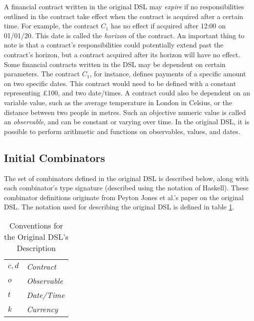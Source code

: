 A financial contract written in the original DSL may \textit{expire} if no responsibilities outlined in the contract take effect when the contract is acquired after a certain time. For example, the contract $C_1$ has no effect if acquired after 12:00 on 01/01/20. This date is called the \textit{horizon} of the contract. An important thing to note is that a contract's responsibilities could potentially extend past the contract's horizon, but a contract acquired after its horizon will have no effect. \\

Some financial contracts written in the DSL may be dependent on certain parameters. The contract $C_1$, for instance, defines payments of a specific amount on two specific dates. This contract would need to be defined with a constant representing £100, and two date/times. A contract could also be dependent on an variable value, such as the average temperature in London in Celsius, or the distance between two people in metres. Such an objective numeric value is called an \textit{observable}, and can be constant or varying over time. In the original DSL, it is possible to perform arithmetic and functions on observables, values, and dates\cite{SPJ}.

\subsection{Initial Combinators} \label{combinators}

The set of combinators defined in the original DSL is described below, along with each combinator's type signature (described using the notation of Haskell). These combinator definitions originate from Peyton Jones et al.'s paper on the original DSL\cite{SPJ}. The notation used for describing the original DSL is defined in table \ref{dsl-notation}.\\

\begin{table}[ht]
    \begin{center}
        \begin{tabular}{|ll|}
            \hline
            $c, d$ &\textit{Contract} \\
            $o$ &\textit{Observable} \\
            $t$ &\textit{Date/Time} \\
            $k$ &\textit{Currency} \\
            \hline
        \end{tabular}
        \caption{Conventions for the Original DSL's Description}
        \label{dsl-notation}
    \end{center}
\end{table}

